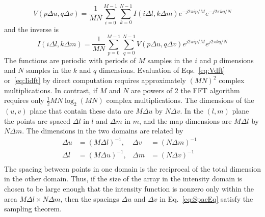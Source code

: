 \begin{equation}
\label{eq:Vdft}
V(p\Delta{u},q\Delta{v}) = \frac{1}{MN}\sum^{M-1}_{i = 0}\sum^{N-1}_{k=0}I(i\Delta{l},k\Delta{m}){e^{-j2\pi{ip}/M}}{e^{-j2\pi{kq}/N}}
\end{equation}
and the inverse is
\begin{equation}
\label{eq:Iidft}
I(i\Delta{l},k\Delta{m})= \frac{1}{MN}\sum^{M-1}_{p = 0}\sum^{N-1}_{q=0}V(p\Delta{u},q\Delta{v}) {e^{j2\pi{ip}/M}}{e^{j2\pi{kq}/N}}
\end{equation}
The functions are periodic with periods of $M$ samples in the $i$ and $p$ dimensions and $N$ samples in the $k$ and $q$ dimensions. Evaluation of Eqs.~\ref{eq:Vdft} or~\ref{eq:Iidft} by direct computation requires approximately $(MN)^2$ complex multiplications. In contrast, if $M$ and $N$ are powers of 2 the FFT algorithm requires only $\frac{1}{2}MN\log_2(MN)$ complex multiplications. The dimensions of the $(u ,v)$ plane that contain these data are $M\Delta{u}$ by $N\Delta{v}$. In the $(l,m)$ plane the points are spaced $\Delta{l}$ in $l$ and $\Delta{m}$ in $m$, and the map dimensions are $M\Delta{l}$ by $N\Delta{m}$. The dimensions in the two domains are related by
\begin{align}
\label{eq:SpacEq}
\Delta{u} &= (M\Delta{l})^{-1},&  \Delta{v} &= (N\Delta{m})^{-1}& \nonumber \\
\Delta{l} &=(M\Delta{u})^{-1},&  \Delta{m} &= (N\Delta{v})^{-1}& \nonumber \\
\end{align}
The spacing between points in one domain is the reciprocal of the total dimension in the other domain. Thus, if the size of the array in the intensity domain is chosen to be large enough that the intensity function is nonzero only within the area $M\Delta{l} \times N\Delta{m}$, then the spacings $\Delta{u}$ and $\Delta{v}$ in Eq.~\ref{eq:SpacEq} satisfy the sampling theorem.
